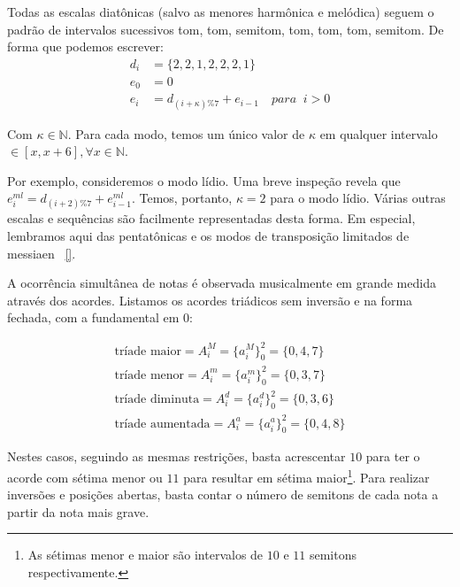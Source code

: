 Todas as escalas diatônicas (salvo as menores harmônica e melódica)
seguem o padrão de intervalos sucessivos
tom, tom, semitom, tom, tom, tom, semitom. De forma
que podemos escrever:
\begin{equation}
\begin{split}
d_i & =\{2,2,1,2,2,2,1\} \\
e_0 & =0 \\
e_i & =d_{(i+\kappa)\%7}+e_{i-1} \quad para \;\;  i > 0
\end{split}
\end{equation}

Com $\kappa \in \mathbb{N}$. Para cada
modo, temos um único valor de $\kappa$ em qualquer intervalo $\in [x,x+6], \forall x \in \mathbb{N}$.


Por exemplo, consideremos o modo lídio. Uma breve
inspeção revela que $e_i^{ml}=d_{(i+2)\%7}+e_{i-1}^{ml}$. Temos, portanto, $\kappa=2$
para o modo lídio. 
Várias outras escalas e sequências são facilmente representadas desta forma. Em especial,
lembramos aqui das pentatônicas e os modos de transposição limitados de messiaen ~\ref{}.

A ocorrência simultânea de notas é observada musicalmente em grande medida
através dos acordes. Listamos os acordes triádicos sem inversão e na forma fechada,
com a fundamental em $0$:

\begin{equation}
\begin{split}
\text{tríade maior} = A_i^M= \{a_i^M\}_0^2=\{0,4,7\} \\ 
\text{tríade menor} = A_i^m = \{a_i^m\}_0^2=\{0,3,7\} \\
\text{tríade diminuta} = A_i^d = \{a_i^d\}_0^2=\{0,3,6\} \\
\text{tríade aumentada} = A_i^a = \{a_i^a\}_0^2=\{0,4,8\}
\end{split}
\end{equation}

Nestes casos, seguindo as mesmas restrições, basta acrescentar $10$ para ter o acorde
com sétima menor ou $11$ para resultar em sétima maior\footnote{As sétimas
menor e maior são intervalos de $10$ e $11$ semitons respectivamente.}. Para realizar inversões e posições abertas,
basta contar o número de semitons de cada nota a partir da nota mais grave.

